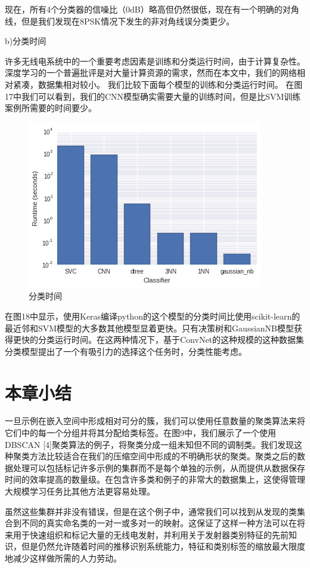现在，所有4个分类器的信噪比（0dB）略高但仍然很低，现在有一个明确的对角线，但是我们发现在8PSK情况下发生的非对角线误分类更少。\par

b)分类时间

许多无线电系统中的一个重要考虑因素是训练和分类运行时间，由于计算复杂性。 深度学习的一个普遍批评是对大量计算资源的需求，然而在本文中，我们的网络相对紧凑，数据集相对较小。 我们比较下面每个模型的训练和分类运行时间。 在图17中我们可以看到，我们的CNN模型确实需要大量的训练时间，但是比SVM训练案例所需要的时间要少。\par
\begin{figure}[!h]
	\centering
	\includegraphics[scale=0.5]{figures/chapter_3/train_time}
	\caption{分类时间}	\label{sec:fig_3_13}
\end{figure}

在图18中显示，使用Keras编译python的这个模型的分类时间比使用scikit-learn的最近邻和SVM模型的大多数其他模型显着更快。只有决策树和GaussianNB模型获得更快的分类运行时间。在这两种情况下，基于ConvNet的这种规模的这种数据集分类模型提出了一个有吸引力的选择这个任务时，分类性能考虑。\par


\section{本章小结}

一旦示例在嵌入空间中形成相对可分的簇，我们可以使用任意数量的聚类算法来将它们中的每一个分组并将其分配给类标签。在图9中，我们展示了一个使用DBSCAN [4]聚类算法的例子，将聚类分成一组未知但不同的调制类。我们发现这种聚类方法比较适合在我们的压缩空间中形成的不明确形状的聚类。聚类之后的数据处理可以包括标记许多示例的集群而不是每个单独的示例，从而提供从数据保存时间的效率提高的数量级。在包含许多类和例子的非常大的数据集上，这使得管理大规模学习任务比其他方法更容易处理。\par
虽然这些集群并非没有错误，但是在这个例子中，通常我们可以找到从发现的类集合到不同的真实命名类的一对一或多对一的映射。这保证了这样一种方法可以在将来用于快速组织和标记大量的无线电发射，并利用关于发射器类别特征的先前知识，但是仍然允许随着时间的推移识别系统能力，特征和类别标签的缩放最大限度地减少这样做所需的人力劳动。\par

